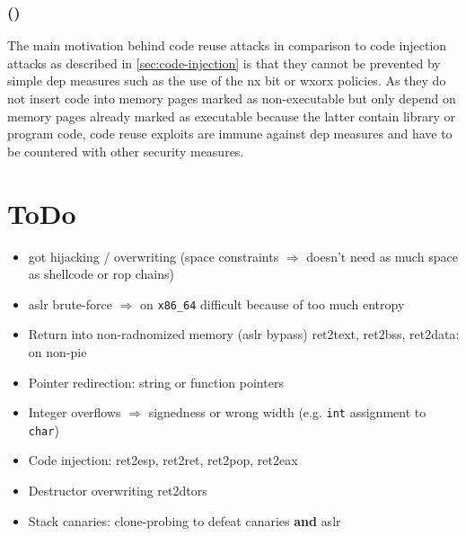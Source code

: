\subsubsection{ ()}
\label{subsubsec:cr-dep}

The main motivation behind code reuse attacks in comparison to code injection attacks as described in \cref{sec:code-injection} is that they cannot be prevented by simple \gls{dep} measures such as the use of the \gls{nx} bit or \gls{wxorx} policies.
As they do not insert code into memory pages marked as non-executable but only depend on memory pages already marked as executable because the latter contain library or program code, code reuse exploits are immune against \gls{dep} measures and have to be countered with other security measures.

\section*{ToDo}

\begin{itemize}
	\item{
		\gls{got} hijacking / overwriting (space constraints $\Rightarrow$ doesn't need as much space as shellcode or \gls{rop} chains)
	}
	\item{
		\gls{aslr} brute-force $\Rightarrow$ on \texttt{x86\_64} difficult because of too much entropy
	}
	\item{
		Return into non-radnomized memory (\gls{aslr} bypass) ret2text, ret2bss, ret2data: on non-\gls{pie}
	}
	\item{
		Pointer redirection: string or function pointers
	}
	\item{
		Integer overflows $\Rightarrow$ signedness or wrong width (e.g. \texttt{int} assignment to \texttt{char})
	}
	\item{
		Code injection: ret2esp, ret2ret, ret2pop, ret2eax
	}
	\item{
		Destructor overwriting ret2dtors
	}
	\item{
		Stack canaries: clone-probing to defeat canaries \textbf{and} \gls{aslr}
	}
\end{itemize}
